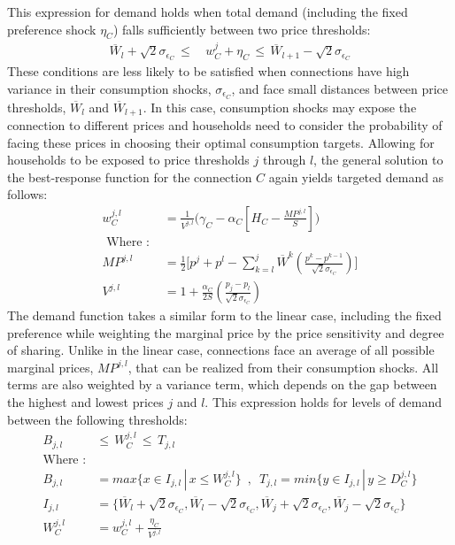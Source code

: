 \documentclass[12pt]{article}
\begin{document}
This expression for demand holds when total demand (including the fixed preference shock $\eta_C$) falls sufficiently between two price thresholds: 
\begin{align*}
\overline{W}_{l} + \sqrt{2} \sigma_{\epsilon_C}  \, \leq \, & w^{j}_C + \eta_C \, \leq  \, \overline{W}_{l+1} - \sqrt{2} \sigma_{\epsilon_C} 
\end{align*}
These conditions are less likely to be satisfied when connections have high variance in their consumption shocks, $\sigma_{\epsilon_C}$,  and face small distances between price thresholds, $\overline{W}_{l}$ and $\overline{W}_{l+1}$.  In this case, consumption shocks may expose the connection to different prices and households need to consider the probability of facing these prices in choosing their optimal consumption targets.  Allowing for households to be exposed to price thresholds $j$ through $l$, the general solution to the best-response function for the connection $C$ again yields targeted demand as follows:
\begin{align*}
w_{C}^{j,l}       		&= \frac{ 1}{ V^{j,l} } \Big ( \gamma_C - \alpha_C [ H_{C} - \frac{MP^{j,l}}{S} ] \Big )    \\
\text{ Where : }& \\
MP^{j,l} &=\frac{1}{2} \big  [ p^{j} + p^{l} - \sum_{k=l}^{j} \overline{W}^{k} (\frac{p^{k} - p^{k-1}}{\sqrt{2}{\sigma_{\epsilon_C}}}) \big ]  \\
V^{j,l}	     	    &=  1 + \frac{\alpha_C}{2 S} ( \frac{p_j - p_l}{\sqrt{2}\sigma_{\epsilon_C}}) 
\end{align*}
The demand function takes a similar form to the linear case, including the fixed preference while weighting the marginal price by the price sensitivity and degree of sharing.  Unlike in the linear case, connections face an average of all possible marginal prices, $MP^{j,l}$, that can be realized from their consumption shocks.  All terms are also weighted by a variance term, which depends on the gap between the highest and lowest prices $j$ and $l$.  This expression holds for levels of demand between the following thresholds:
\begin{align*}
B_{j,l} \, & \leq \, W_C^{j,l} \, \leq \, T_{j,l} \\
\text{Where :} & \\
B_{j,l} &= max \{ x \in I_{j,l} \, | \, x \leq W_C^{j,l} \} \,\,\, , \,\,\, T_{j,l} = min  \{ y \in I_{j,l} \, | \, y \geq D_C^{j,l} \} \\
I_{j,l} &= \{ \overline{W}_{l} + \sqrt{2} \sigma_{\epsilon_C}, \overline{W}_{l} - \sqrt{2}\sigma_{\epsilon_C}, \overline{W}_{j} + \sqrt{2} \sigma_{\epsilon_C},  \overline{W}_{j} - \sqrt{2} \sigma_{\epsilon_C}  \} \\
W_C^{j,l} &=  w_C^{j,l} + \frac{ \eta_C }{ V^{j,l} } 
\end{align*}
\end{document}
